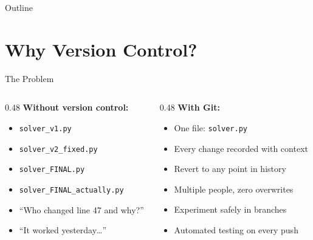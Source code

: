 \documentclass[aspectratio=169, 11pt]{beamer}
\begin{document}

{
\begin{frame}{Outline}
  \tableofcontents
\end{frame}
}

\section{Why Version Control?}

\begin{frame}{The Problem}
  \begin{columns}[T]
    \begin{column}{0.48\textwidth}
      \textbf{Without version control:}
      \begin{itemize}
        \item \texttt{solver\_v1.py}
        \item \texttt{solver\_v2\_fixed.py}
        \item \texttt{solver\_FINAL.py}
        \item \texttt{solver\_FINAL\_actually.py}
        \item ``Who changed line 47 and why?''
        \item ``It worked yesterday\ldots''
      \end{itemize}
    \end{column}
    \begin{column}{0.48\textwidth}
      \textbf{With Git:}
      \begin{itemize}
        \item One file: \texttt{solver.py}
        \item Every change recorded with context
        \item Revert to any point in history
        \item Multiple people, zero overwrites
        \item Experiment safely in branches
        \item Automated testing on every push
      \end{itemize}
    \end{column}
  \end{columns}
\end{frame}
\end{document}
